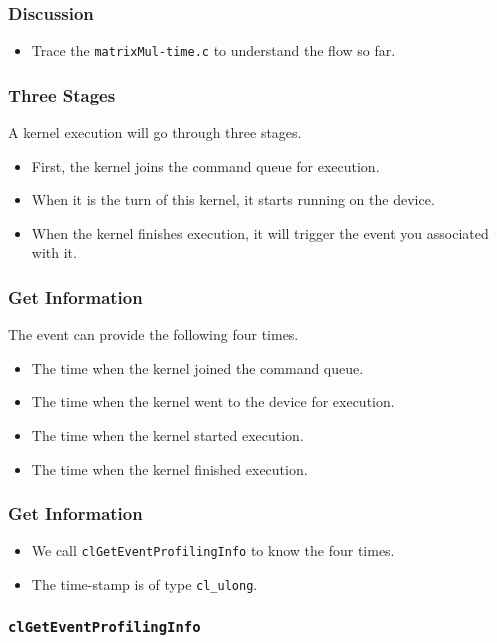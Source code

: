 \documentclass{beamer}
\begin{document}
\begin{frame}
\end{frame}

\begin{frame}
  \frametitle{Discussion}
  \begin{itemize}
    \item Trace the {\tt matrixMul-time.c} to understand the flow so far.
  \end{itemize}
\end{frame}

\begin{frame}
  \frametitle{Three Stages}
  A kernel execution will go through three stages.
  \begin{itemize}
    \item First, the kernel joins the command queue for execution.
    \item When it is the turn of this kernel, it starts running on the
      device.
    \item When the kernel finishes execution, it will trigger the
      event you associated with it.
  \end{itemize}
\end{frame}

\begin{frame}
  \frametitle{Get Information}
  The event can provide the following four times.
  \begin{itemize}
    \item The time when the kernel joined the command queue.
    \item The time when the kernel went to the device for execution.
    \item The time when the kernel started execution.
    \item The time when the kernel finished execution.
  \end{itemize}
\end{frame}

\begin{frame}
  \frametitle{Get Information}
  \begin{itemize}
    \item We call {\tt clGetEventProfilingInfo} to know the four
      times.
    \item The time-stamp is of type {\tt cl\_ulong}.
  \end{itemize}
\end{frame}

\begin{frame}
  \frametitle{\tt clGetEventProfilingInfo}
\end{frame}
\end{document}
